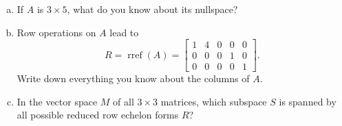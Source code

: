 \begin{exercise}\label{ex:u15-p4}
\begin{enumerate}[(a)]
  \item If $A$ is $3\times 5$, what do you know about its nullspace?
  \item Row operations on $A$ lead to
    \[
      R=\operatorname{rref}(A)=\begin{bmatrix}1&4&0&0&0\\0&0&0&1&0\\0&0&0&0&1\end{bmatrix}.
    \]
    Write down everything you know about the columns of $A$.
  \item In the vector space $M$ of all $3\times 3$ matrices, which subspace $S$ is spanned by
    all possible reduced row echelon forms $R$?
\end{enumerate}
\end{exercise}

